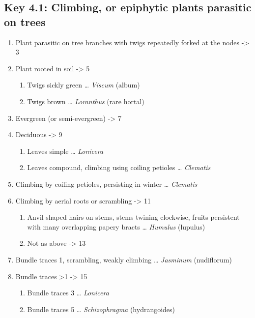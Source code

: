 \documentclass[openany]{book}
\providecommand{\tightlist}{%
  \setlength{\itemsep}{0pt}\setlength{\parskip}{0pt}}
\begin{document}
\hypertarget{key-4.1-climbing-or-epiphytic-plants-parasitic-on-trees}{%
\subsection{Key 4.1: Climbing, or epiphytic plants parasitic on
trees}\label{key-4.1-climbing-or-epiphytic-plants-parasitic-on-trees}}

\begin{enumerate}
\def\labelenumi{\arabic{enumi}.}
\tightlist
\item
  Plant parasitic on tree branches with twigs repeatedly forked at the
  nodes -\textgreater{} 3
\item
  Plant rooted in soil -\textgreater{} 5

  \begin{enumerate}
  \def\labelenumii{\arabic{enumii}.}
  \setcounter{enumii}{2}
  \tightlist
  \item
    Twigs sickly green \ldots{} \emph{Viscum} (album)
  \item
    Twigs brown \ldots{} \emph{Loranthus} (rare hortal)
  \end{enumerate}
\item
  Evergreen (or semi-evergreen) -\textgreater{} 7
\item
  Deciduous -\textgreater{} 9

  \begin{enumerate}
  \def\labelenumii{\arabic{enumii}.}
  \setcounter{enumii}{6}
  \tightlist
  \item
    Leaves simple \ldots{} \emph{Lonicera}
  \item
    Leaves compound, climbing using coiling petioles \ldots{}
    \emph{Clematis}
  \end{enumerate}
\item
  Climbing by coiling petioles, persisting in winter \ldots{}
  \emph{Clematis}
\item
  Climbing by aerial roots or scrambling -\textgreater{} 11

  \begin{enumerate}
  \def\labelenumii{\arabic{enumii}.}
  \setcounter{enumii}{10}
  \tightlist
  \item
    Anvil shaped hairs on stems, stems twining clockwise, fruits
    persistent with many overlapping papery bracts \ldots{}
    \emph{Humulus} (lupulus)
  \item
    Not as above -\textgreater{} 13
  \end{enumerate}
\item
  Bundle traces 1, scrambling, weakly climbing \ldots{} \emph{Jasminum}
  (nudiflorum)
\item
  Bundle traces \textgreater{}1 -\textgreater{} 15

  \begin{enumerate}
  \def\labelenumii{\arabic{enumii}.}
  \setcounter{enumii}{14}
  \tightlist
  \item
    Bundle traces 3 \ldots{} \emph{Lonicera}
  \item
    Bundle traces 5 \ldots{} \emph{Schizophragma} (hydrangoides)
  \end{enumerate}
\end{enumerate}
\end{document}
